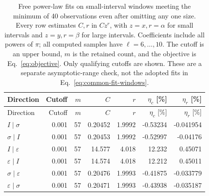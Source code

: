 \begin{longtable}{lrrrrrr}
\caption{Free power-law fits on small-interval windows meeting the minimum of 40 observations even after omitting any one size. Every row estimates $C,r$ in $Cz^r$, with $z=x,r=\alpha$ for small intervals and $z=y,r=\beta$ for large intervals. Coefficients include all powers of $\pi$; all computed samples have $\ell=6,\ldots,10$. The cutoff is an upper bound, $m$ is the retained count, and the objective is Eq.~\eqref{eq:objective}. Only qualifying cutoffs are shown. These are a separate asymptotic-range check, not the adopted fits in Eq.~\eqref{eq:common-fit-windows}.}
\label{tab:ising-small-windows}\\\toprule
Direction & Cutoff & $m$ & $C$ & $r$ & $\eta_c$ [\%] & $\eta_r$ [\%]\\\midrule
\endfirsthead
\toprule
Direction & Cutoff & $m$ & $C$ & $r$ & $\eta_c$ [\%] & $\eta_r$ [\%]\\\midrule
\endhead
\bottomrule\endfoot
$I\mid \sigma$ & 0.001 & 57 & 0.20452 & 1.9992 & -0.53234 & -0.041954\\
$\sigma\mid I$ & 0.001 & 57 & 0.20453 & 1.9992 & -0.52997 & -0.04176\\
$I\mid \varepsilon$ & 0.001 & 57 & 14.577 & 4.018 & 12.232 & 0.45071\\
$\varepsilon\mid I$ & 0.001 & 57 & 14.574 & 4.018 & 12.212 & 0.45011\\
$\sigma\mid \varepsilon$ & 0.001 & 57 & 0.20476 & 1.9993 & -0.41875 & -0.033779\\
$\varepsilon\mid \sigma$ & 0.001 & 57 & 0.20471 & 1.9993 & -0.43938 & -0.035187\\
\end{longtable}
